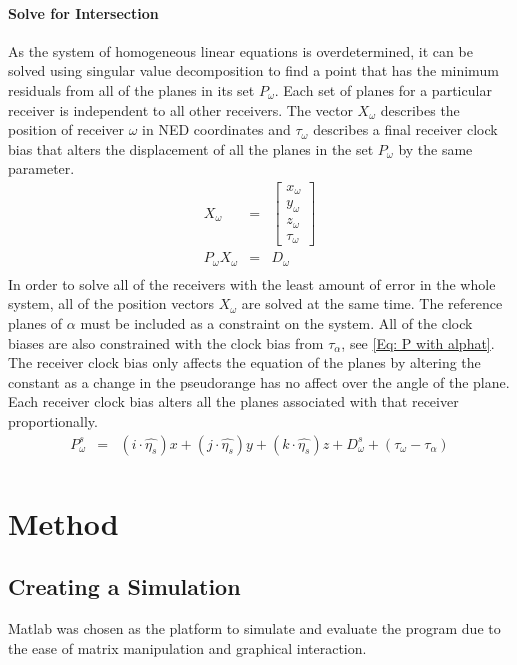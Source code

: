 \documentclass[11pt,a4paper]{article}
\begin{document}
\paragraph{Solve for Intersection}
As the system of homogeneous linear equations is overdetermined, it can be solved using singular value decomposition to find a point that has the minimum residuals from all of the planes in its set $P_\omega$. Each set of planes for a particular receiver is independent to all other receivers. The vector $X_\omega$ describes the position of receiver $\omega$ in NED coordinates and $\tau_\omega$ describes a final receiver clock bias that alters the displacement of all the planes in the set $P_\omega$ by the same parameter.
\begin{eqnarray}
X_\omega &=& \begin{bmatrix}
x_\omega \\y_\omega \\ z_\omega \\ \tau_\omega
\end{bmatrix}\\
P_\omega X_\omega &=& D_\omega \\
\end{eqnarray}
In order to solve all of the receivers with the least amount of error in the whole system, all of the position vectors $X_\omega$ are solved at the same time. The reference planes of $\alpha$ must be included as a constraint on the system. All of the clock biases are also constrained with the clock bias from $\tau_\alpha$, see \eqref{Eq: P with alphat}.
The receiver clock bias only affects the equation of the planes by altering the constant as a change in the pseudorange has no affect over the angle of the plane. Each receiver clock bias alters all the planes associated with that receiver proportionally. 
\begin{eqnarray}
P_\omega^s &=& (i\cdot\hat{\eta_s})x + (j\cdot\hat{\eta_s})y + (k\cdot\hat{\eta_s})z + D_\omega^s + (\tau_\omega-\tau_\alpha) \label{Eq: P with alphat}\\
\end{eqnarray}
 



\section{Method}
\subsection{Creating a Simulation}
Matlab was chosen as the platform to simulate and evaluate the program due to the ease of matrix manipulation and graphical interaction.
\end{document}
